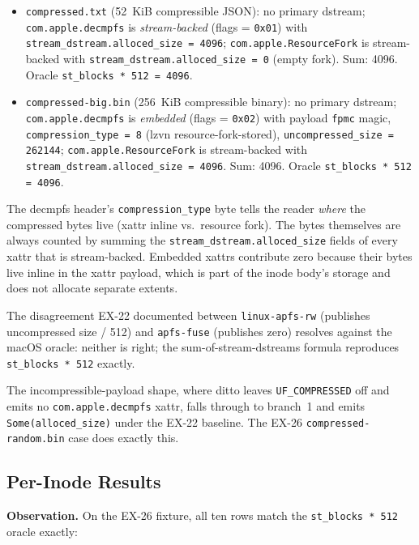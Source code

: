 \begin{itemize}
  \item \texttt{compressed.txt} (52~KiB compressible JSON): no
    primary dstream; \texttt{com.apple.decmpfs} is
    \emph{stream-backed} (flags = \texttt{0x01}) with
    \texttt{stream\_dstream.alloced\_size = 4096};
    \texttt{com.apple.ResourceFork} is stream-backed with
    \texttt{stream\_dstream.alloced\_size = 0} (empty fork).
    Sum: 4096. Oracle \texttt{st\_blocks * 512 = 4096}.
  \item \texttt{compressed-big.bin} (256~KiB compressible binary):
    no primary dstream; \texttt{com.apple.decmpfs} is
    \emph{embedded} (flags = \texttt{0x02}) with payload
    \texttt{fpmc} magic, \texttt{compression\_type = 8} (lzvn
    resource-fork-stored), \texttt{uncompressed\_size = 262144};
    \texttt{com.apple.ResourceFork} is stream-backed with
    \texttt{stream\_dstream.alloced\_size = 4096}. Sum: 4096.
    Oracle \texttt{st\_blocks * 512 = 4096}.
\end{itemize}

The decmpfs header's \texttt{compression\_type} byte tells the
reader \emph{where} the compressed bytes live (xattr inline vs.\
resource fork). The bytes themselves are always counted by summing
the \texttt{stream\_dstream.alloced\_size} fields of every xattr
that is stream-backed. Embedded xattrs contribute zero because
their bytes live inline in the xattr payload, which is part of the
inode body's storage and does not allocate separate extents.

The disagreement EX-22 documented between \texttt{linux-apfs-rw}
(publishes uncompressed size / 512) and \texttt{apfs-fuse}
(publishes zero) resolves against the macOS oracle: neither is
right; the sum-of-stream-dstreams formula reproduces
\texttt{st\_blocks * 512} exactly.

The incompressible-payload shape, where ditto leaves
\texttt{UF\_COMPRESSED} off and emits no \texttt{com.apple.decmpfs}
xattr, falls through to branch~1 and emits
\texttt{Some(alloced\_size)} under the EX-22 baseline. The EX-26
\texttt{compressed-random.bin} case does exactly this.

\subsection{Per-Inode Results}

\textbf{Observation.} On the EX-26 fixture, all ten rows match the
\texttt{st\_blocks * 512} oracle exactly:

